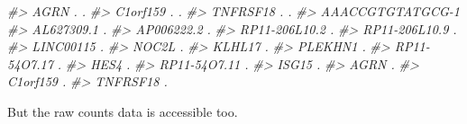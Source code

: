 \documentclass[
]{book}
\newenvironment{Shaded}{\begin{snugshade}}{\end{snugshade}}
\newcommand{\CommentTok}[1]{\textcolor[rgb]{0.56,0.35,0.01}{\textit{#1}}}
\begin{document}
\begin{Shaded}
\begin{Highlighting}[]
\CommentTok{\#\textgreater{} AGRN                  .                 .      }
\CommentTok{\#\textgreater{} C1orf159              .                 .      }
\CommentTok{\#\textgreater{} TNFRSF18              .                 .      }
\CommentTok{\#\textgreater{}               AAACCGTGTATGCG{-}1}
\CommentTok{\#\textgreater{} AL627309.1                   .}
\CommentTok{\#\textgreater{} AP006222.2                   .}
\CommentTok{\#\textgreater{} RP11{-}206L10.2                .}
\CommentTok{\#\textgreater{} RP11{-}206L10.9                .}
\CommentTok{\#\textgreater{} LINC00115                    .}
\CommentTok{\#\textgreater{} NOC2L                        .}
\CommentTok{\#\textgreater{} KLHL17                       .}
\CommentTok{\#\textgreater{} PLEKHN1                      .}
\CommentTok{\#\textgreater{} RP11{-}54O7.17                 .}
\CommentTok{\#\textgreater{} HES4                         .}
\CommentTok{\#\textgreater{} RP11{-}54O7.11                 .}
\CommentTok{\#\textgreater{} ISG15                        .}
\CommentTok{\#\textgreater{} AGRN                         .}
\CommentTok{\#\textgreater{} C1orf159                     .}
\CommentTok{\#\textgreater{} TNFRSF18                     .}
\end{Highlighting}
\end{Shaded}

But the raw counts data is accessible too.
\end{document}
